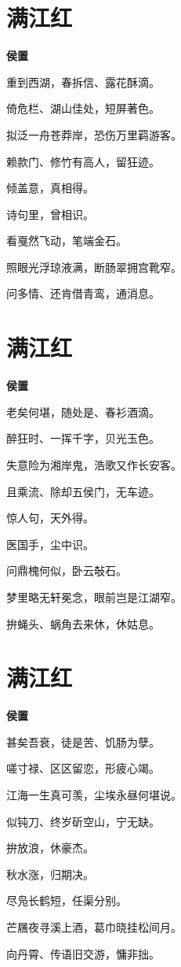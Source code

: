\documentclass[12pt,a4paper]{ctexbook}
\begin{document}
\section{满江红}
\textbf{侯置}\par\vspace{0.5em}
重到西湖，春拆信、露花酥滴。\par
倚危栏、湖山佳处，短屏著色。\par
拟泛一舟苍莽岸，恐伤万里羁游客。\par
赖款门、修竹有高人，留狂迹。\par
倾盖意，真相得。\par
诗句里，曾相识。\par
看戛然飞动，笔端金石。\par
照眼光浮琼液满，断肠翠拥宫靴窄。\par
问多情、还肯借青鸾，通消息。\par

\section{满江红}
\textbf{侯置}\par\vspace{0.5em}
老矣何堪，随处是、春衫酒滴。\par
醉狂时、一挥千字，贝光玉色。\par
失意险为湘岸鬼，浩歌又作长安客。\par
且乘流、除却五侯门，无车迹。\par
惊人句，天外得。\par
医国手，尘中识。\par
问鼎槐何似，卧云敧石。\par
梦里略无轩冕念，眼前岂是江湖窄。\par
拚蝇头、蜗角去来休，休姑息。\par

\section{满江红}
\textbf{侯置}\par\vspace{0.5em}
甚矣吾衰，徒是苦、饥肠为孽。\par
嗟寸禄、区区留恋，形疲心竭。\par
江海一生真可羡，尘埃永昼何堪说。\par
似钝刀、终岁斫空山，宁无缺。\par
拚放浪，休豪杰。\par
秋水涨，归期决。\par
尽凫长鹤短，任渠分别。\par
芒屩夜寻溪上酒，葛巾晓挂松间月。\par
向丹霄、传语旧交游，慵非拙。\par
\end{document}
